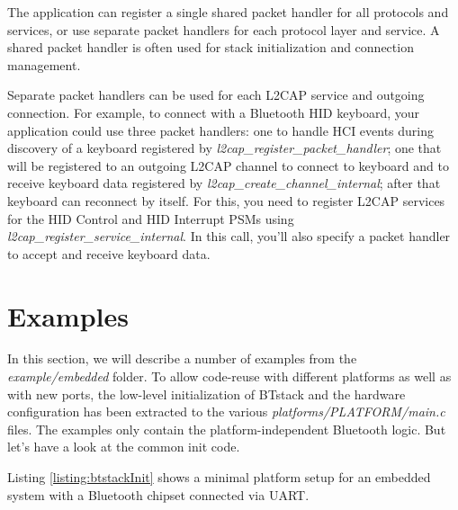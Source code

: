 \documentclass[a4paper,titlepage,oneside,12pt]{amsart} %
\newcommand{\urlfoot}[2]{\href{#1}{{\color{blue} #2}}\footnote{#1}}
\begin{document}
The application can register a single shared packet handler for all protocols and services, or use separate packet handlers for each protocol layer and service. A shared packet handler is often used for stack initialization and connection management.

Separate packet handlers can be used for each L2CAP service and outgoing connection. For example, to connect with a Bluetooth HID keyboard, your application could use three packet handlers: one to handle HCI events during discovery of a keyboard registered by \emph{l2cap\_register\_packet\_handler}; one that will be registered to an outgoing L2CAP channel to connect to keyboard and to receive keyboard data registered by \emph{l2cap\_create\_channel\_internal}; after that keyboard can reconnect by itself. For this, you need to register L2CAP services for the HID Control and HID Interrupt PSMs using \emph{l2cap\_register\_service\_internal}. In this call, you'll also specify a packet handler to accept and receive keyboard data. 

\newcommand{\BluetoothSpecification}{\urlfoot{https://www.bluetooth.org/Technical/Specifications/adopted.htm}{Bluetooth Specification}}
\newcommand{\BluetoothSpecificationURL}{\href{https://www.bluetooth.org/Technical/Specifications/adopted.htm}{\color{blue} Bluetooth Specification}}



\pagebreak 
\section{Examples}
\label{section:examples}

In this section, we will describe a number of examples from the \emph{example/embedded} folder. To allow code-reuse with different platforms as well as with new ports, the low-level initialization of BTstack and the hardware configuration has been extracted to the various \emph{platforms/PLATFORM/main.c} files. The examples only contain the platform-independent Bluetooth logic. But let's have a look at the common init code. 

Listing \ref{listing:btstackInit} shows a minimal platform setup for an embedded system with a Bluetooth chipset connected via UART.
\end{document}
